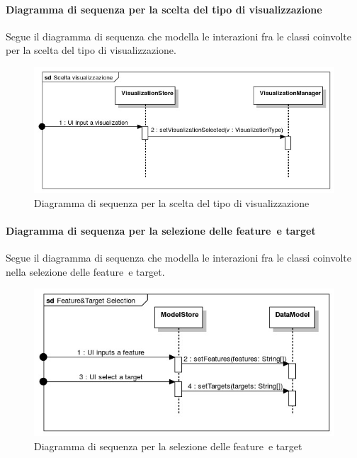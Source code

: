         \paragraph{Diagramma di sequenza per la scelta del tipo di visualizzazione}
        Segue il diagramma di sequenza che modella le interazioni fra le classi coinvolte per la scelta del tipo di visualizzazione.
        \begin{figure}[H]
                \centering\includegraphics[width=1\textwidth]{source/img/sequenza2.jpeg}
                \caption{Diagramma di sequenza per la scelta del tipo di visualizzazione}
            \end{figure}
        \paragraph{Diagramma di sequenza per la selezione delle feature\glo\ e target}
        Segue il diagramma di sequenza che modella le interazioni fra le classi coinvolte nella selezione delle feature\glo\ e target.
        \begin{figure}[H]
                \centering\includegraphics[width=1\textwidth]{source/img/sequenza3.jpeg}
                \caption{Diagramma di sequenza per la selezione delle feature\glo\ e target}
            \end{figure}
        
